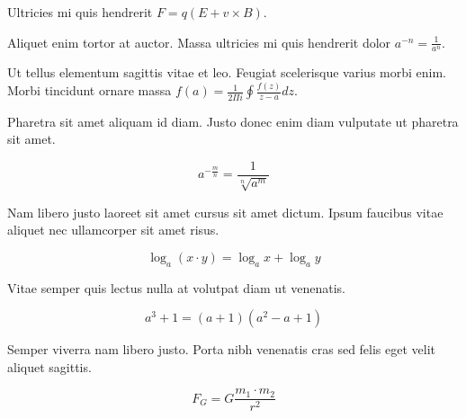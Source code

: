 \documentclass{article}
\begin{document}
Ultricies mi quis hendrerit \begin{math}
	F=q\left ( E+v \times B \right )
\end{math}.\newline

Aliquet enim tortor at auctor. Massa ultricies mi quis hendrerit dolor $ a^{-n}=\frac{1}{a^{n}} $.\newline

Ut tellus elementum sagittis vitae et leo. Feugiat scelerisque varius morbi enim. Morbi tincidunt ornare massa \( f\left ( a \right ) = \frac{1}{2\Pi i} \oint \frac{f\left ( z \right )}{z-a} dz \).\newline

Pharetra sit amet aliquam id diam. Justo donec enim diam vulputate ut pharetra sit amet.

\[ a^{-\frac{m}{n}}=\frac{1}{\sqrt[n]{a^{m}}} \]

Nam libero justo laoreet sit amet cursus sit amet dictum. Ipsum faucibus vitae aliquet nec ullamcorper sit amet risus.

$$ \log _{a}(x\cdot y)=\log _{a}x+\log _{a}y $$

Vitae semper quis lectus nulla at volutpat diam ut venenatis.

\begin{displaymath}
	a^{3}+1=(a+1)(a^{2}-a+1)
\end{displaymath}

Semper viverra nam libero justo. Porta nibh venenatis cras sed felis eget velit aliquet sagittis.

\begin{equation}
	F_{G}=G\frac{m_1\cdot m_2}{r^2}
\end{equation}
\end{document}
